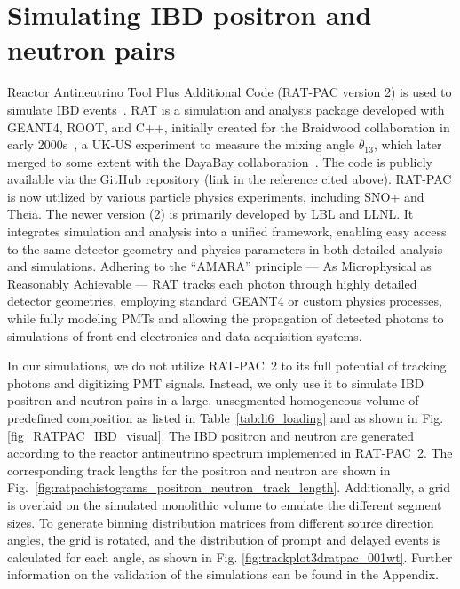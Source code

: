 \documentclass[tightenlines,
twocolumn,prl,notitlepage,nofootinbib,preprintnumbers,longbibliography]{revtex4-1}
\begin{document}
\section{Simulating IBD positron and neutron pairs}
Reactor Antineutrino Tool Plus Additional Code (RAT-PAC version 2) is used to simulate IBD events~\cite{osti_2377202}.
RAT is a simulation and analysis package developed with GEANT4, ROOT, and C++, initially created for the Braidwood collaboration in early 2000s~\cite{BOLTON2005166}, a UK-US experiment to measure the mixing angle $\theta_{13}$, which later merged to some extent with the DayaBay collaboration~\cite{HAHN2006134}.
The code is publicly available via the GitHub repository (link in the reference cited above).
RAT-PAC is now utilized by various particle physics experiments, including SNO+ and Theia. 
The newer version (2) is primarily developed by LBL and LLNL.
It integrates simulation and analysis into a unified framework, enabling easy access to the same detector geometry and physics parameters in both detailed analysis and simulations. Adhering to the ``AMARA'' principle --- As Microphysical as Reasonably Achievable --- RAT tracks each photon through highly detailed detector geometries, employing standard GEANT4 or custom physics processes, while fully modeling PMTs and allowing the propagation of detected photons to simulations of front-end electronics and data acquisition systems.

In our simulations, we do not utilize RAT-PAC~2 to its full potential of tracking photons and digitizing PMT signals. Instead, we only use it to simulate IBD positron and neutron pairs in a large, unsegmented homogeneous volume of predefined composition as listed in Table~\ref{tab:li6_loading} and as shown in Fig. \ref{fig_RATPAC_IBD_visual}. 
The IBD positron and neutron are generated according to the reactor antineutrino spectrum implemented in RAT-PAC~2. The corresponding track lengths for the positron and neutron are shown in Fig.~\ref{fig:ratpachistograms_positron_neutron_track_length}. Additionally, a grid is overlaid on the simulated monolithic volume to emulate the different segment sizes. To generate binning distribution matrices from different source direction angles, the grid is rotated, and the distribution of prompt and delayed events is calculated for each angle, as shown in Fig. \ref{fig:trackplot3dratpac_001wt}.
Further information on the validation of the simulations can be found in the Appendix.
\end{document}
